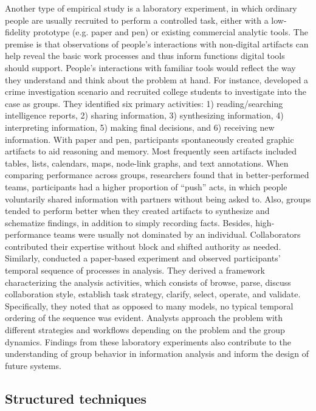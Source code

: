 Another type of empirical study is a laboratory
experiment, in which ordinary people are usually recruited to perform a
controlled task, either with a low-fidelity prototype (e.g. paper and pen) or
existing commercial analytic tools. The premise is that observations of people’s
interactions with non-digital artifacts can help reveal the basic work processes
and thus inform functions digital tools should support. People’s interactions
with familiar tools would reflect the way they understand and think about the
problem at hand. For instance, \cite{Borge2012,Carroll2013} developed a crime investigation scenario and recruited
college students to investigate into the case as groups. They identified six
primary activities: 1) reading/searching intelligence reports, 2) sharing
information, 3) synthesizing information, 4) interpreting information, 5) making
final decisions, and 6) receiving new information. With paper and pen,
participants spontaneously created graphic artifacts to aid reasoning and
memory. Most frequently seen artifacts included tables, lists, calendars, maps,
node-link graphs, and text annotations. When comparing performance across
groups, researchers found that in better-performed teams, participants had a
higher proportion of ``push'' acts, in which people voluntarily shared information
with partners without being asked to. Also, groups tended to perform better when
they created artifacts to synthesize and schematize findings, in addition to
simply recording facts. Besides, high-performance teams were usually not dominated
by an individual. Collaborators contributed their expertise without block and
shifted authority as needed. Similarly, \cite{Isenberg2008b} conducted a paper-based experiment and observed participants’
temporal sequence of processes in analysis. They derived a framework
characterizing the analysis activities, which consists of browse, parse, discuss
collaboration style, establish task strategy, clarify, select, operate, and
validate. Specifically, they noted that as opposed to many models, no typical
temporal ordering of the sequence was evident. Analysts approach the problem
with different strategies and workflows depending on the problem and the group
dynamics. Findings from these laboratory experiments also contribute to the
understanding of group behavior in information analysis and inform the design of
future systems. 


\subsection{Structured techniques}


